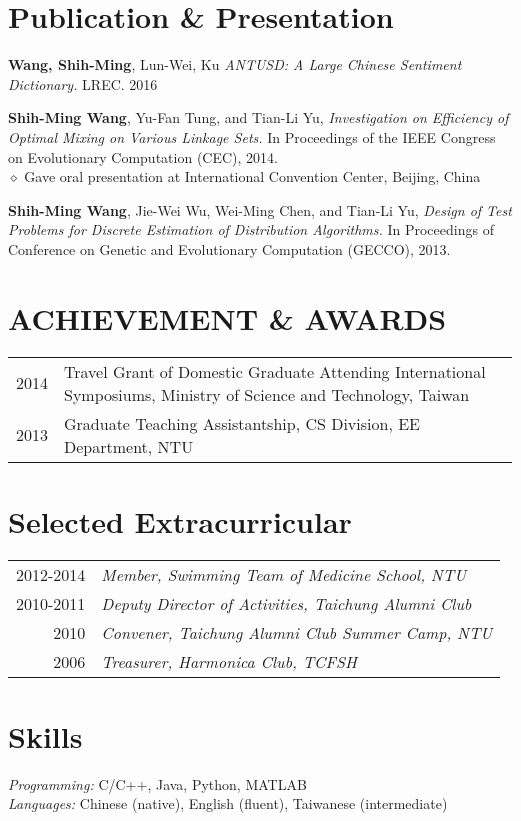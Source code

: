 \documentclass[a4paper,10pt]{article}
\begin{document}
\section{Publication \& Presentation}
\begin{hangparas}{.25in}{1}
\textbf{Wang, Shih-Ming}, Lun-Wei, Ku \textit{ANTUSD: A Large Chinese Sentiment Dictionary.} LREC. 2016
\end{hangparas}
\begin{hangparas}{.25in}{1}
\textbf{Shih-Ming Wang}, Yu-Fan Tung, and Tian-Li Yu, \textit{Investigation on Efficiency of Optimal Mixing on Various Linkage Sets.} In Proceedings of the IEEE Congress on Evolutionary Computation (CEC), 2014.\\
$\diamond$ \footnotesize{Gave oral presentation at International Convention Center, Beijing, China}
\end{hangparas}
\begin{hangparas}{.25in}{1}
\textbf{Shih-Ming Wang}, Jie-Wei Wu, Wei-Ming Chen, and Tian-Li Yu, \textit{Design of Test Problems for Discrete Estimation of Distribution Algorithms.} In Proceedings of Conference on Genetic and Evolutionary Computation (GECCO), 2013.
\end{hangparas}


\section{ACHIEVEMENT \& AWARDS}

\begin{tabular}{l|p{14cm}}
2014 & Travel Grant of Domestic Graduate Attending International Symposiums, Ministry of Science and Technology, Taiwan \\
2013 & Graduate Teaching Assistantship, CS Division, EE Department, NTU\\
\end{tabular}

\section{Selected  Extracurricular}
\begin{tabular}{r|l}
2012-2014 & \sl{Member,} Swimming Team of Medicine School, NTU   \\
2010-2011 & \sl{Deputy Director of Activities,} Taichung Alumni Club \\
2010      & \sl{Convener,} Taichung Alumni Club Summer Camp, NTU   \\
2006      & \sl{Treasurer,} Harmonica Club, TCFSH
\end{tabular}

\section{Skills}
{\sl Programming:} C/C++, Java, Python, MATLAB\textregistered\\
{\sl Languages:} Chinese (native), English (fluent), Taiwanese (intermediate)


%
\end{document}
